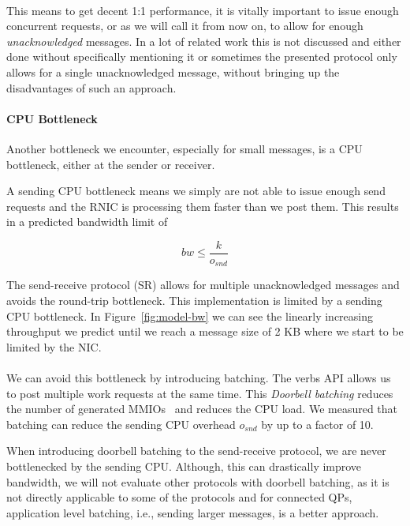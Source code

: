 \paragraph{} This means to get decent 1:1 performance, it is vitally important to issue enough concurrent requests, or as we 
will call it from now on, to allow for enough \emph{unacknowledged} messages. In a lot of related work this is not discussed
and either done without specifically mentioning it or sometimes the presented protocol only allows for a single unacknowledged
message, without bringing up the disadvantages of such an approach.


\paragraph{CPU Bottleneck} Another bottleneck we encounter, especially for small messages, is a CPU bottleneck, either at the 
sender or receiver.

A sending CPU bottleneck means we simply are not able to issue enough send requests and the RNIC is processing them faster
than we post them. This results in a predicted bandwidth limit of

$$
bw \leq \frac{k}{o_{snd}}
$$


The send-receive protocol (SR) allows for multiple unacknowledged messages and avoids the round-trip bottleneck. 
This implementation is limited by a sending CPU bottleneck. In Figure~\ref{fig:model-bw} we can see the linearly
increasing throughput we predict until we reach a message size of 2 KB where we start to be limited by the NIC.

\paragraph{} We can avoid this bottleneck by introducing batching. The verbs API allows us to post multiple work requests at 
the same time. This \emph{Doorbell batching} reduces the number of generated MMIOs~\cite{anuj-guide} and reduces the CPU 
load. We measured that batching can reduce the sending CPU overhead $o_{snd}$ by up to a factor of 10. 

When introducing doorbell batching to the send-receive protocol, we are never bottlenecked by the sending CPU. 
Although, this can drastically improve bandwidth, we will not evaluate other protocols with doorbell batching, as it is
not directly applicable to some of the protocols and for connected QPs, application level batching, i.e., sending larger 
messages, is a better approach.

